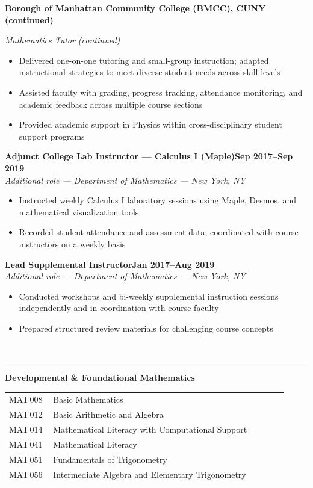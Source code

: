 \documentclass[a4paper, 11pt]{article}
\newcommand{\cvsection}[2]{%
  \vspace{14pt}%
  \noindent#1\enspace{\large\bfseries\MakeUppercase{#2}}\\[-3pt]%
  \rule{\linewidth}{1pt}%
  \vspace{5pt}\par\noindent%
}
\newcommand{\subvspace}{\vspace{6pt}}
\newcommand{\workplace}[1]{%
  \noindent\textbf{#1}\par\vspace{2pt}%
}
\newcommand{\workrole}[3]{%
  \noindent\hspace*{1em}\textbf{#1}\hfill\textbf{#2}\\
  \hspace*{1em}\textit{#3}\par
}
\begin{document}
\newpage
\workplace{Borough of Manhattan Community College (BMCC), CUNY \textnormal{(continued)}}
\noindent\hspace*{1em}\textit{Mathematics Tutor (continued)}\par
\begin{itemize}
  \item Delivered one-on-one tutoring and small-group instruction; adapted
        instructional strategies to meet diverse student needs across skill levels
  \item Assisted faculty with grading, progress tracking, attendance monitoring, and
        academic feedback across multiple course sections
  \item Provided academic support in Physics within cross-disciplinary student
        support programs
\end{itemize}

\subvspace

\workrole{Adjunct College Lab Instructor --- Calculus I (Maple)}%
  {Sep 2017--Sep 2019}{Additional role --- Department of Mathematics --- New York, NY}
\begin{itemize}
  \item Instructed weekly Calculus I laboratory sessions using Maple, Desmos, and
        mathematical visualization tools
  \item Recorded student attendance and assessment data; coordinated with course
        instructors on a weekly basis
\end{itemize}

\subvspace

\workrole{Lead Supplemental Instructor}%
  {Jan 2017--Aug 2019}{Additional role --- Department of Mathematics --- New York, NY}
\begin{itemize}
  \item Conducted workshops and bi-weekly supplemental instruction sessions independently
        and in coordination with course faculty
  \item Prepared structured review materials for challenging course concepts
\end{itemize}

\cvsection{\faBookOpen}{Courses Taught or Supported}

\noindent\textbf{Developmental \& Foundational Mathematics}\\[4pt]
\begin{tabular}{@{}p{0.15\linewidth}p{0.80\linewidth}@{}}
MAT\,008 & Basic Mathematics\\
MAT\,012 & Basic Arithmetic and Algebra\\
MAT\,014 & Mathematical Literacy with Computational Support\\
MAT\,041 & Mathematical Literacy\\
MAT\,051 & Fundamentals of Trigonometry\\
MAT\,056 & Intermediate Algebra and Elementary Trigonometry\\
\end{tabular}
\end{document}
